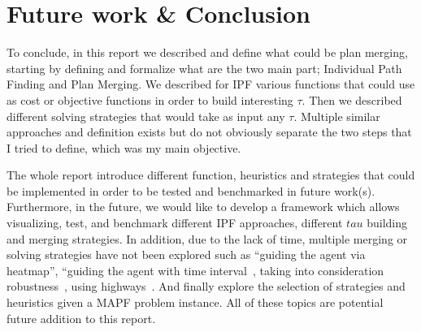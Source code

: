 \section{Future work \& Conclusion}

To conclude, in this report we described and define what could be plan merging, starting by defining and formalize what are the two main part; Individual Path Finding and Plan Merging. We described for IPF various functions that could use as cost or objective functions in order to build interesting \(\tau\). Then we described different solving strategies that would take as input any \(\tau\). Multiple similar approaches and definition \cite{komenda2013repair,lichhadapeko22a} exists but do not obviously separate the two steps that I tried to define, which was my main objective.  

The whole report introduce different function, heuristics and strategies that could be implemented in order to be tested and benchmarked in future work(s). Furthermore, in the future, we would like to develop a framework which allows visualizing, test, and benchmark different IPF approaches, different \(tau\) building and merging strategies. 
In addition, due to the lack of time, multiple merging or solving strategies have not been explored such as ``guiding the agent via heatmap'', ``guiding the agent with time interval~\cite{phli11a,naphli12a}, taking into consideration robustness~\cite{atstfewabazh20a,atstfestko20a}, using highways~\cite{coko16a,courkuxuayko16a}. And finally explore the selection of strategies and heuristics given a MAPF problem instance. All of these topics are potential future addition to this report.